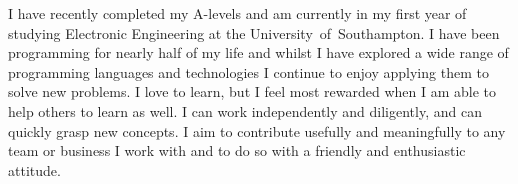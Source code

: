 
I have recently completed my A-levels and am currently in my first year of studying Electronic Engineering at the \mbox{University of Southampton}. I have been programming for nearly half of my life and whilst I have explored a wide range of programming languages and technologies I continue to enjoy applying them to solve new problems. I love to learn, but I feel most rewarded when I am able to help others to learn as well. I can work independently and diligently, and can quickly grasp new concepts. I aim to contribute usefully and meaningfully to any team or business I work with and to do so with a friendly and enthusiastic attitude.

